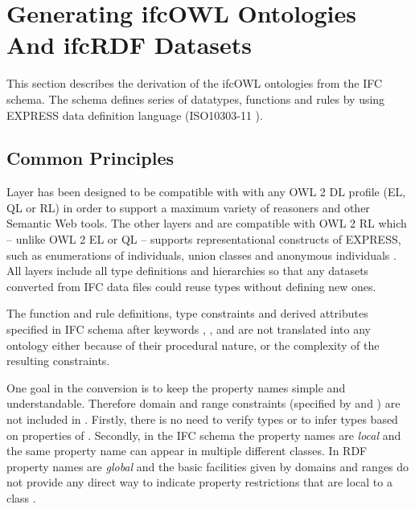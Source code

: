 
\section{Generating ifcOWL Ontologies And ifcRDF Datasets}
\label{sec:ifcOWL}
This section describes the derivation of the ifcOWL ontologies from the IFC schema. The schema defines series of datatypes, functions and rules by using EXPRESS data definition language (ISO10303-11 \cite{schenck1994information}).

\subsection{Common Principles}

Layer \ifcsimple{} has been designed to be compatible with with any OWL 2 DL profile (EL, QL or RL) in order to support a maximum variety of reasoners and other Semantic Web tools. The other layers \standard{} and \extended{} are compatible with OWL 2 RL which -- unlike OWL 2 EL or QL -- supports representational constructs of EXPRESS, such as enumerations of individuals, union classes and anonymous individuals \cite{motik2012owl}. All \ifcowl{} layers include all type definitions and hierarchies so that any \ifcrdf{} datasets converted from IFC data files could reuse types without defining new ones.

The function and rule definitions, type constraints and derived attributes specified in IFC schema after keywords , , and  are not translated into any \ifcowl{} ontology either because of their procedural nature, or the complexity of the resulting constraints.

One goal in the conversion is to keep the property names simple and understandable. Therefore domain and range constraints (specified by  and ) are not included in \ifcowl{}. Firstly, there is no need to verify types or to infer types based on properties of \ifcowl{}. Secondly, in the IFC schema the property names are \emph{local} and the same property name can appear in multiple different classes. In RDF property names are \emph{global} and the basic facilities given by domains and ranges do not provide any direct way to indicate property restrictions that are local to a class \cite{world2014rdf}. 

